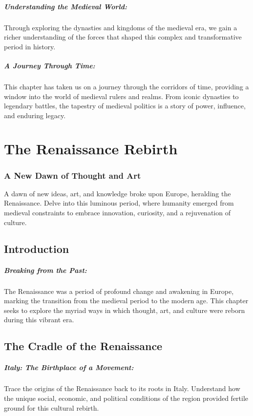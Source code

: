 \documentclass[a4paper,12pt]{book}
\begin{document}
\paragraph{Understanding the Medieval World:}
Through exploring the dynasties and kingdoms of the medieval era, we gain a richer understanding of the forces that shaped this complex and transformative period in history.

\paragraph{A Journey Through Time:}
This chapter has taken us on a journey through the corridors of time, providing a window into the world of medieval rulers and realms. From iconic dynasties to legendary battles, the tapestry of medieval politics is a story of power, influence, and enduring legacy.

\chapter{The Renaissance Rebirth}
\subsection*{A New Dawn of Thought and Art}
A dawn of new ideas, art, and knowledge broke upon Europe, heralding the Renaissance. Delve into this luminous period, where humanity emerged from medieval constraints to embrace innovation, curiosity, and a rejuvenation of culture.

\section*{Introduction}

\paragraph{Breaking from the Past:}
The Renaissance was a period of profound change and awakening in Europe, marking the transition from the medieval period to the modern age. This chapter seeks to explore the myriad ways in which thought, art, and culture were reborn during this vibrant era.

\section*{The Cradle of the Renaissance}

\paragraph{Italy: The Birthplace of a Movement:}
Trace the origins of the Renaissance back to its roots in Italy. Understand how the unique social, economic, and political conditions of the region provided fertile ground for this cultural rebirth.
\end{document}

